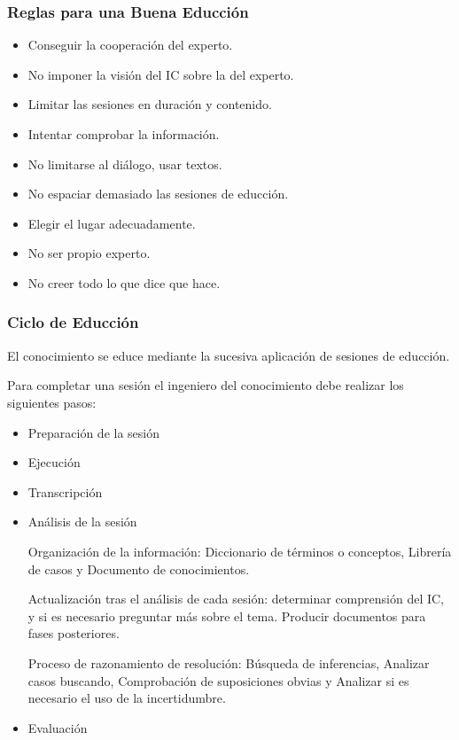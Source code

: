 \documentclass[12pt, twoside, openright]{report} %
\begin{document}
\subsubsection{Reglas para una Buena Educción}
\begin{itemize}
	\item Conseguir la cooperación del experto.
	\item No imponer la visión del IC sobre la del experto.
	\item Limitar las sesiones en duración y contenido.
	\item Intentar comprobar la información.
	\item No limitarse al diálogo, usar textos.
	\item No espaciar demasiado las sesiones de educción.
	\item Elegir el lugar adecuadamente.
	\item No ser propio experto.
	\item No creer todo lo que dice que hace.
\end{itemize}

\subsubsection{Ciclo de Educción}
El conocimiento se educe mediante la sucesiva aplicación de sesiones de educción.

Para completar una sesión el ingeniero del conocimiento debe realizar los siguientes pasos:
\begin{itemize}
	\item Preparación de la sesión
	\item Ejecución
	\item Transcripción
	\item Análisis de la sesión

	      Organización de la información: Diccionario de términos o conceptos, Librería de casos y Documento de conocimientos.

	      Actualización tras el análisis de cada sesión: determinar comprensión del IC, y si es necesario preguntar más sobre el tema. Producir documentos para fases posteriores.

	      Proceso de razonamiento de resolución: Búsqueda de inferencias, Analizar casos buscando, Comprobación de suposiciones obvias y Analizar si es necesario el uso de la incertidumbre.
	\item Evaluación
\end{itemize}
\end{document}
